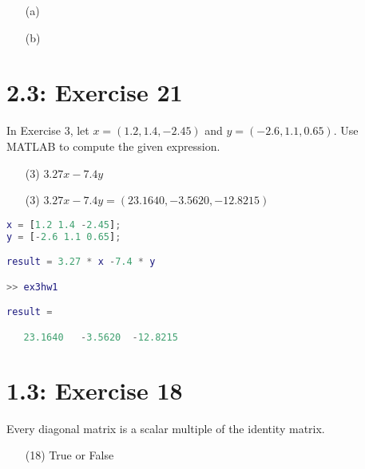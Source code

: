 \documentclass{report}
\begin{document}
\sol 

\begin{enumerate}
\item[(a)]     

\item[(b)]     

\end{enumerate}

\section*{2.3: Exercise 21} 

In Exercise 3, let 
$x=(1.2,1.4,-2.45)$ and $y=(-2.6,1.1,0.65)$. Use MATLAB to compute the 
given expression.

\begin{enumerate}
    \item[(3) ]$3.27x-7.4y$
    
\end{enumerate}

\sol 

\begin{enumerate}
\item[(3)]     
$3.27x - 7.4y =  \boxed{(23.1640, -3.5620, -12.8215)}$
\end{enumerate}

\begin{lstlisting}[language=Matlab, caption={MATLAB code}, xleftmargin=\parindent]
x = [1.2 1.4 -2.45];
y = [-2.6 1.1 0.65];

result = 3.27 * x -7.4 * y 

>> ex3hw1

result =

   23.1640   -3.5620  -12.8215

\end{lstlisting}


\section*{1.3: Exercise 18} 

Every diagonal matrix is a scalar multiple of the identity matrix.

\begin{enumerate}
    \item[(18)] True or False
    
\end{enumerate}
\end{document}
